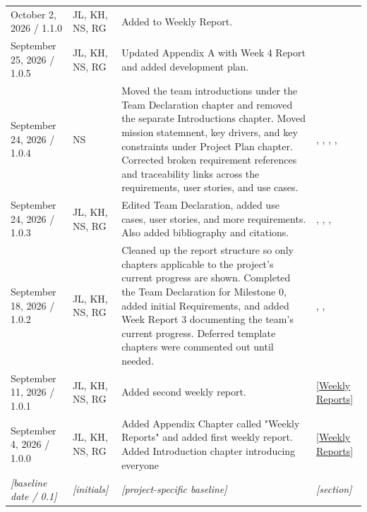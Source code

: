 \begin{tabularx}{\linewidth}{L{2.7cm}L{2.0cm}YL{1.8cm}}
October 2, 2026 / 1.1.0 & JL, KH, NS, RG &
Added to Weekly Report. &
\\

September 25, 2026 / 1.0.5 & JL, KH, NS, RG &
Updated Appendix A with Week 4 Report and added development plan. &
 \\

September 24, 2026 / 1.0.4 & NS &
Moved the team introductions under the Team Declaration chapter and removed the separate Introductions chapter. Moved mission statemnent, key drivers, and key constraints under Project Plan chapter. Corrected broken requirement references and traceability links across the requirements, user stories, and use cases. &
,
,
, , \\

September 24, 2026 / 1.0.3 & JL, KH, NS, RG &
Edited Team Declaration, added use cases, user stories, and more requirements. Also added bibliography and citations.&
, , , \\

September 18, 2026 / 1.0.2 & JL, KH, NS, RG &
Cleaned up the report structure so only chapters applicable to the project's current progress are shown. Completed the Team Declaration for Milestone 0, added initial Requirements, and added Week Report 3 documenting the team's current progress. Deferred template chapters were commented out until needed. &
, ,
\\

September 11, 2026 / 1.0.1 & JL, KH, NS, RG & Added second weekly report. & \ref{Weekly Reports}\\

September 4, 2026 / 1.0.0 & JL, KH, NS, RG & Added Appendix Chapter called "Weekly Reports" and added first weekly report. Added Introduction chapter introducing everyone & \ref{Weekly Reports}\\
\textit{[baseline date / 0.1]} & \textit{[initials]} & \textit{[project-specific baseline]} & \textit{[section]}\\
\end{tabularx}
